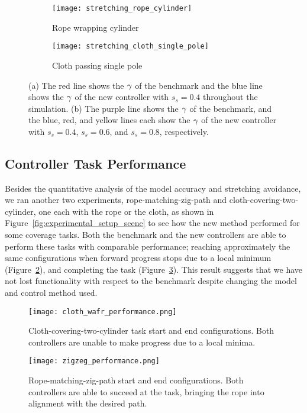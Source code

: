 \begin{figure}[h]
    \centering
    \begin{subfigure}{0.49\textwidth}
        \centering
        \texttt{[image: stretching\_rope\_cylinder]}%
        \caption{Rope wrapping cylinder}
    \end{subfigure}\hfill
    \begin{subfigure}{0.49\textwidth}
        \texttt{[image: stretching\_cloth\_single\_pole]}%
        \caption{Cloth passing single pole}
    \end{subfigure}
    \caption{(a) The red line shows the $\gamma$ of the benchmark and the blue line shows the $\gamma$ of the new controller with $s_s = 0.4$ throughout the simulation. (b) The purple line shows the $\gamma$ of the benchmark, and the blue, red, and yellow lines each show the $\gamma$ of the new controller with $s_s = 0.4$, $s_s = 0.6$, and $s_s = 0.8$, respectively.}
    \label{fig:experiment_stretching_factor}
\end{figure}

\FloatBarrier

\subsection{Controller Task Performance}
\label{Results:Controller Task Performance}

Besides the quantitative analysis of the model accuracy and stretching avoidance, we ran another two experiments, rope-matching-zig-path and cloth-covering-two-cylinder, one each with the rope or the cloth, as shown in Figure~\ref{fig:experimental_setup_scene} to see how the new method performed for some coverage tasks. Both the benchmark and the new controllers are able to perform these tasks with comparable performance; reaching approximately the same configurations when forward progress stops due to a local minimum (Figure~\ref{fig:cloth_wafr_performance}), and completing the task (Figure~\ref{fig:zigzeg_performance}). This result suggests that we have not lost functionality with respect to the benchmark despite changing the model and control method used.


\begin{figure}[h]
    \centering
    \texttt{[image: cloth\_wafr\_performance.png]}
    \caption{Cloth-covering-two-cylinder task start and end configurations. Both controllers are unable to make progress due to a local minima.}
    \label{fig:cloth_wafr_performance}
\end{figure}
\begin{figure}[h]
    \centering
    \texttt{[image: zigzeg\_performance.png]}
    \caption{Rope-matching-zig-path start and end configurations. Both controllers are able to succeed at the task, bringing the rope into alignment with the desired path.}
    \label{fig:zigzeg_performance}
\end{figure}

